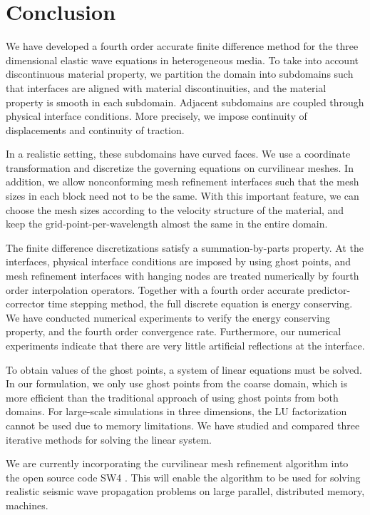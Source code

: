 \section{Conclusion}
We have developed a fourth order accurate finite difference method for the three dimensional elastic wave equations in heterogeneous media. To take into account discontinuous material property, we partition the domain into subdomains such that interfaces are aligned with material discontinuities, and the material property is smooth in each subdomain. Adjacent subdomains are coupled through physical interface conditions. More precisely, we impose continuity of displacements and continuity of traction. 

In a realistic setting, these subdomains have curved faces. We use a coordinate transformation and discretize the governing equations on curvilinear meshes. In addition, we allow nonconforming mesh refinement interfaces such that the mesh sizes in each block need not to be the same. With this important feature, we can choose the mesh sizes according to the velocity structure of the material, and keep the grid-point-per-wavelength almost the same in the entire domain. 

The finite difference discretizations satisfy a summation-by-parts property. At the interfaces, physical interface conditions are imposed by using ghost points, and mesh refinement interfaces with hanging nodes are treated numerically by fourth order interpolation operators. Together with a fourth order accurate predictor-corrector time stepping method, the full discrete equation is energy conserving. We have conducted numerical experiments to verify the energy conserving property, and the fourth order convergence rate. Furthermore, our numerical experiments indicate that there are very little artificial reflections at the interface.

To obtain values of the ghost points, a system of linear equations must be solved. In our formulation, we only use ghost points from the coarse domain, which is more efficient than the traditional approach of using ghost points from both domains.  For large-scale simulations in three dimensions, the LU factorization cannot be used due to memory limitations. We have studied and compared three iterative methods for solving the linear system.

We are currently incorporating the curvilinear mesh refinement algorithm into the open source code SW4 \cite{SW4}. This will enable the algorithm to be used for solving realistic seismic wave propagation problems on large parallel, distributed memory, machines.